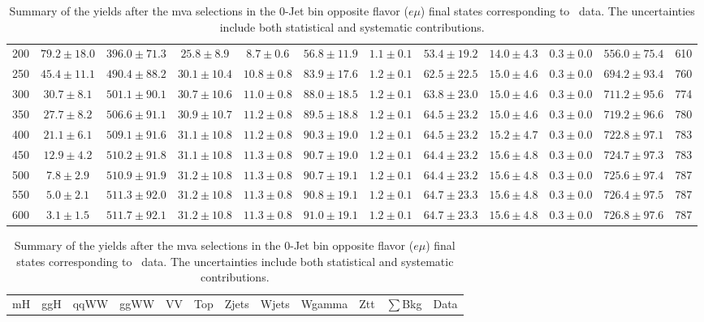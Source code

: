 \begin{table}[!ht]
{\begin{center}
\begin{tabular}{l c c c c c c c c c c c }
200 & $79.2\pm18.0$ & $396.0\pm71.3$ & $25.8\pm8.9$ & $8.7\pm0.6$ & $56.8\pm11.9$ & $1.1\pm0.1$ & $53.4\pm19.2$ & $14.0\pm4.3$ & $0.3\pm0.0$ & $556.0\pm75.4$ & 610 \\
250 & $45.4\pm11.1$ & $490.4\pm88.2$ & $30.1\pm10.4$ & $10.8\pm0.8$ & $83.9\pm17.6$ & $1.2\pm0.1$ & $62.5\pm22.5$ & $15.0\pm4.6$ & $0.3\pm0.0$ & $694.2\pm93.4$ & 760 \\
300 & $30.7\pm8.1$ & $501.1\pm90.1$ & $30.7\pm10.6$ & $11.0\pm0.8$ & $88.0\pm18.5$ & $1.2\pm0.1$ & $63.8\pm23.0$ & $15.0\pm4.6$ & $0.3\pm0.0$ & $711.2\pm95.6$ & 774 \\
350 & $27.7\pm8.2$ & $506.6\pm91.1$ & $30.9\pm10.7$ & $11.2\pm0.8$ & $89.5\pm18.8$ & $1.2\pm0.1$ & $64.5\pm23.2$ & $15.0\pm4.6$ & $0.3\pm0.0$ & $719.2\pm96.6$ & 780 \\
400 & $21.1\pm6.1$ & $509.1\pm91.6$ & $31.1\pm10.8$ & $11.2\pm0.8$ & $90.3\pm19.0$ & $1.2\pm0.1$ & $64.5\pm23.2$ & $15.2\pm4.7$ & $0.3\pm0.0$ & $722.8\pm97.1$ & 783 \\
450 & $12.9\pm4.2$ & $510.2\pm91.8$ & $31.1\pm10.8$ & $11.3\pm0.8$ & $90.7\pm19.0$ & $1.2\pm0.1$ & $64.4\pm23.2$ & $15.6\pm4.8$ & $0.3\pm0.0$ & $724.7\pm97.3$ & 783 \\
500 & $7.8\pm2.9$ & $510.9\pm91.9$ & $31.2\pm10.8$ & $11.3\pm0.8$ & $90.7\pm19.1$ & $1.2\pm0.1$ & $64.4\pm23.2$ & $15.6\pm4.8$ & $0.3\pm0.0$ & $725.6\pm97.4$ & 787 \\
550 & $5.0\pm2.1$ & $511.3\pm92.0$ & $31.2\pm10.8$ & $11.3\pm0.8$ & $90.8\pm19.1$ & $1.2\pm0.1$ & $64.7\pm23.3$ & $15.6\pm4.8$ & $0.3\pm0.0$ & $726.4\pm97.5$ & 787 \\
600 & $3.1\pm1.5$ & $511.7\pm92.1$ & $31.2\pm10.8$ & $11.3\pm0.8$ & $91.0\pm19.1$ & $1.2\pm0.1$ & $64.7\pm23.3$ & $15.6\pm4.8$ & $0.3\pm0.0$ & $726.8\pm97.6$ & 787 \\
\hline
\end{tabular}
\end{center}
}
\caption{Summary of the yields after the mva selections in the 0-Jet bin opposite flavor ($e\mu$) final states corresponding to \intlumi\ data. The uncertainties include 
both statistical and systematic contributions. }
{%
 \tiny
 \begin{center}
 \begin{tabular}{l c c c c c c c c c c c }
 \hline
 mH & ggH & qqWW & ggWW & VV & Top & Zjets & Wjets & Wgamma & Ztt & $\sum$Bkg & Data \\

\end{tabular}
\end{center}}
\end{table}
